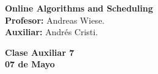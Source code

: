 \documentclass[11pt, spanish]{article}
\theoremstyle{plain}
\begin{document}

\begin{flushleft}
  \textbf{Online Algorithms and Scheduling}
  \\\textbf{Profesor:} Andreas Wiese.
  \\\textbf{Auxiliar:} Andrés Cristi.
\end{flushleft}


\begin{center}
  \large{\textbf{Clase Auxiliar 7\\ 07 de Mayo }}
\end{center}

\end{document}
